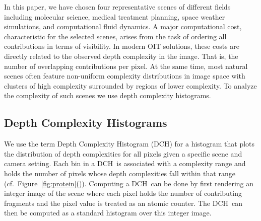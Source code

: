 \documentclass{egpubl}
\newcommand{\dch}{DCH}
\begin{document}
In this paper, we have chosen four representative scenes of different fields including molecular science, medical treatment planning, space weather simulations, and computational fluid dynamics. A major computational cost, characteristic for the selected scenes, arises from the task of ordering all contributions in terms of visibility. In modern OIT solutions, these costs are directly related to the observed depth complexity in the image.
That is, the number of overlapping contributions per pixel. 
%
At the same time, most natural scenes often feature non-uniform complexity distributions in image space with clusters of high complexity surrounded by regions of lower complexity. To analyze the complexity of such scenes we use depth complexity histograms.


\subsection{Depth Complexity Histograms}
\label{sec:dch}
   
We use the term Depth Complexity Histogram (\dch) for a histogram that plots the distribution of depth complexities for all pixels given a specific scene and camera setting. 
Each bin in a \dch\ is associated with a complexity range and holds the number of pixels whose depth complexities fall within that range (cf.\ Figure~\ref{fig:protein}()). 
Computing a \dch\ can be done by first rendering an integer image of the scene where each pixel holds the number of contributing fragments and the pixel value is treated as an atomic counter. The \dch\ can then be computed as a standard histogram over this integer image.
\end{document}

